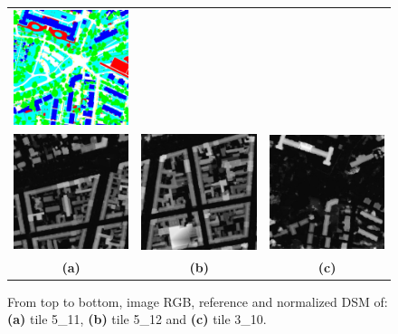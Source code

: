 \documentclass[journal,peerreview,onecolumn]{IEEEtran}
\begin{document}
\begin{figure}[!t]
\begin{tabular}{ccc}
            \includegraphics[width=0.3\columnwidth]{Fig/top_potsdam_3_10_label.jpg} \\
            \includegraphics[width=0.3\columnwidth]{Fig/dsm_potsdam_05_11_normalized_lastools.jpg} &
            \includegraphics[width=0.3\columnwidth]{Fig/dsm_potsdam_05_12_normalized_lastools.jpg} &
            \includegraphics[width=0.3\columnwidth]{Fig/dsm_potsdam_03_10_normalized_lastools.jpg} \\
            {\bfseries{(a)}} & {\bfseries{(b)}}  & {\bfseries{(c)}}\\
        \end{tabular}
        \caption{From top to bottom, image RGB, reference and normalized DSM of: {\bfseries{(a)}} tile 5\_11, {\bfseries{(b)}} tile 5\_12 and {\bfseries{(c)}} tile 3\_10.\label{fig:potsdam-expl}}
    \end{figure}
\end{document}
